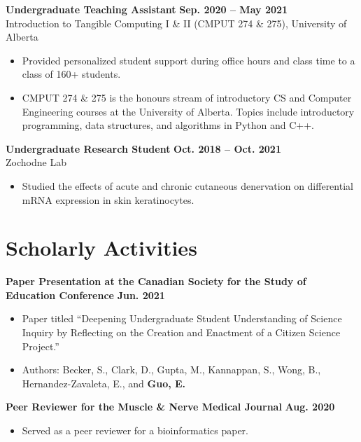 \documentclass{article}
\begin{document}
\textbf{Undergraduate Teaching Assistant} \hfill \textbf{Sep. 2020 -- May 2021}\\
Introduction to Tangible Computing I \& II (CMPUT 274 \& 275), University of Alberta
\begin{itemize}
    \item Provided personalized student support during office hours and class time to a class of 160+ students.
    \item CMPUT 274 \& 275 is the honours stream of introductory CS and Computer Engineering courses at the University of Alberta. Topics include introductory programming, data structures, and algorithms in Python and C++.
\end{itemize}

\textbf{Undergraduate Research Student} \hfill \textbf{Oct. 2018 -- Oct. 2021}\\
Zochodne Lab
\begin{itemize}
    \item Studied the effects of acute and chronic cutaneous denervation on differential mRNA expression in skin keratinocytes.
\end{itemize}


\section*{\textcolor{my_colour}{Scholarly Activities}}
\vspace{-.25em} \hrulefill \vspace{.75em}

\textbf{Paper Presentation at the Canadian Society for the Study of Education Conference} \hfill \textbf{Jun. 2021}
\begin{itemize}
    \item Paper titled ``Deepening Undergraduate Student Understanding of Science Inquiry by Reflecting on the Creation and Enactment of a Citizen Science Project.''
    \item Authors: Becker, S., Clark, D., Gupta, M., Kannappan, S., Wong, B., Hernandez-Zavaleta, E., and \textbf{Guo, E.}
\end{itemize}

\textbf{Peer Reviewer for the Muscle \& Nerve Medical Journal} \hfill \textbf{Aug. 2020}
\begin{itemize}
    \item Served as a peer reviewer for a bioinformatics paper.
\end{itemize}
\end{document}

